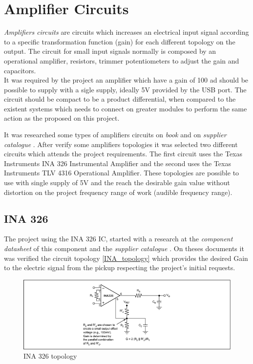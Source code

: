 \chapter{Amplifier Circuits}
\textit{Amplifiers circuits} \cite{amplifier-circuit} are circuits which increases an electrical input signal according
to a specific transformation function (gain) for each different topology on the output. The circuit for small input signals
normally is composed by an operational amplifier, resistors, trimmer potentiometers to adjust the gain and capacitors.\\

It was required by the project an amplifier which have a gain of 100 ad should be possible to supply with a sigle supply, ideally 5V provided by
the USB port. The circuit should be compact to be a product differential, when compared to the existent systems which needs to connect on greater modules
to perform the same action as the proposed on this project.

It was researched some types of amplifiers circuits on \textit{book} \cite{Milmann} and on \textit{supplier catalogue} \cite{OpAmps}.
After verify some amplifiers topologies it was selected two different circuits which attends the project requirements.
The first circuit uses the Texas Instruments INA 326
Instrumental Amplifier and the second uses the Texas Instruments TLV 4316 Operational Amplifier. These topologies are possible to use with
single supply of 5V and the reach the desirable gain value without distortion on the project frequency range of work (audible frequency range).

\section{INA 326}
\label{INA_Circuit}
The project using the INA 326 IC, started with a research at the \textit{component datasheet} \cite{INA326}
of this component and the \textit{supplier catalogue} \cite{OpAmps}. On theses documents it was verified
the circuit topology \autoref{INA_topology} which provides the desired Gain to
the electric signal from the pickup respecting the project's initial requests.

\begin{figure}[!htpb]
\centering
\caption{INA 326 topology}
\label{INA_topology}
\includegraphics[scale=1]{images/Texas_INA}
\end{figure}

